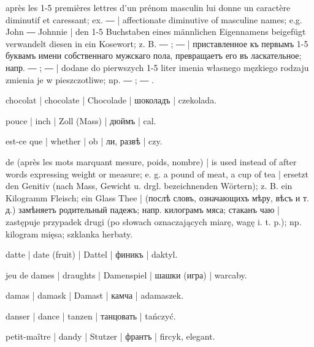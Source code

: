 \begin{outdent}{1em}
après les 1-5 premières lettres d’un prénom masculin lui donne
un caractère diminutif et caressant; ex.  ― 
| affectionate diminutive of masculine names; e.g.  John ―
 Johnnie | den 1-5 Buchstaben eines männlichen Eigennamens
beigefügt verwandelt diesen in ein Kosewort; z. B.  ―
;  ― 
| приставленное къ первымъ 1-5
буквамъ имени собственнаго мужскаго пола, превращаетъ его въ
ласкательное; напр.  ― ;  ― 
| dodane do pierwszych 1-5 liter imenia własnego męzkiego rodzaju
zmienia je w pieszczotliwe; np.  ― ; 
― 
.

chocolat | chocolate | Chocolade | шоколадъ | czekolada.

pouce | inch | Zoll (Mass) | дюймъ | cal.

est-ce que | whether | ob | ли, развѣ | czy.


de (après les mots marquant mesure, poids, nombre) | is used
instead of  after words expressing weight or measure;
e. g.  a pound of meat,  a cup of
tea | ersetzt den Genitiv (nach Mass, Gewicht u. drgl. bezeichnenden
Wörtern); z. B.  ein Kilogramm Fleisch;  ein Glass Thee | (послѣ словъ, означающихъ мѣру, вѣсъ и т. д.)
замѣняетъ родительный падежъ; напр.  килограмъ
мяса;  стаканъ чаю | zastępuje przypadek drugi (po słowach oznaczających miarę, wagę i. t. p.); np.  kilogram mięsa;  szklanka herbaty.

datte | date (fruit) | Dattel | финикъ | daktyl.

jeu de dames | draughts | Damenspiel | шашки (игра) | warcaby.

damas | damask | Damast | камча | adamaszek.

danser | dance | tanzen | танцовать | tańczyć.

petit-maître | dandy | Stutzer | франтъ | fircyk, elegant.


\end{outdent}
